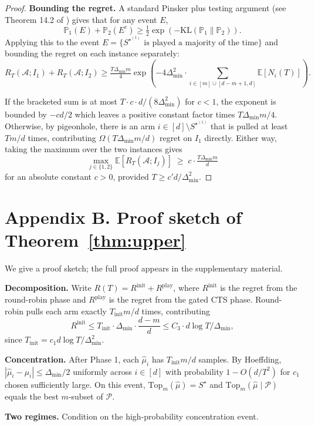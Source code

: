 \documentclass{article}
\theoremstyle{plain}
\theoremstyle{definition}
\theoremstyle{remark}
\newcommand{\E}{\mathbb{E}}
\newcommand{\Prob}{\mathbb{P}}
\newcommand{\Pool}{\mathcal{P}}
\newcommand{\opt}{S^{\star}}
\newcommand{\gap}{\Delta_{\min}}
\begin{document}
\begin{proof}
\textbf{Bounding the regret.} A standard Pinsker plus testing argument (see Theorem 14.2 of \citealp{lattimore2020book}) gives that for any event $E$,
\[
\Prob_1(E) + \Prob_2(E^c) \geq \tfrac{1}{2} \exp(-\mathrm{KL}(\Prob_1 \| \Prob_2)).
\]
Applying this to the event $E = \{\opt^{(1)} \text{ is played a majority of the time}\}$ and bounding the regret on each instance separately:
\[
R_T(\mathcal{A}; I_1) + R_T(\mathcal{A}; I_2) \geq \tfrac{T \gap m}{4} \exp\!\left(- 4\gap^2 \cdot \sum_{i \in [m] \cup [d-m+1, d]} \E[N_i(T)] \right).
\]

If the bracketed sum is at most $T \cdot c \cdot d / (8 \gap^2)$ for $c < 1$, the exponent is bounded by $-c d / 2$ which leaves a positive constant factor times $T \gap m / 4$. Otherwise, by pigeonhole, there is an arm $i \in [d] \setminus \opt^{(1)}$ that is pulled at least $T m / d$ times, contributing $\Omega(T \gap m / d)$ regret on $I_1$ directly. Either way, taking the maximum over the two instances gives
\[
\max_{j \in \{1,2\}} \E[R_T(\mathcal{A}; I_j)] \;\geq\; c \cdot \tfrac{T \gap m}{d}
\]
for an absolute constant $c > 0$, provided $T \geq c' d / \gap^2$.
\end{proof}

\section*{Appendix B. Proof sketch of Theorem~\ref{thm:upper}}
\label{app:upper}

We give a proof sketch; the full proof appears in the supplementary material.

\textbf{Decomposition.} Write $R(T) = R^{\mathrm{init}} + R^{\mathrm{play}}$, where $R^{\mathrm{init}}$ is the regret from the round-robin phase and $R^{\mathrm{play}}$ is the regret from the gated CTS phase. Round-robin pulls each arm exactly $T_{\mathrm{init}} m / d$ times, contributing
\[
R^{\mathrm{init}} \leq T_{\mathrm{init}} \cdot \gap \cdot \frac{d - m}{d} \leq C_3 \cdot d \log T / \gap,
\]
since $T_{\mathrm{init}} = c_1 d \log T / \gap^2$.

\textbf{Concentration.} After Phase 1, each $\hat{\mu}_i$ has $T_{\mathrm{init}} m / d$ samples. By Hoeffding, $|\hat{\mu}_i - \mu_i| \leq \gap / 2$ uniformly across $i \in [d]$ with probability $1 - O(d / T^2)$ for $c_1$ chosen sufficiently large. On this event, $\mathrm{Top}_m(\hat{\mu}) = \opt$ and $\mathrm{Top}_m(\hat{\mu} \mid \Pool)$ equals the best $m$-subset of $\Pool$.

\textbf{Two regimes.} Condition on the high-probability concentration event.
\end{document}
